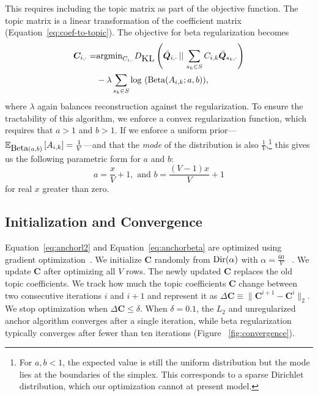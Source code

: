 This requires including the topic matrix as part of the objective function.  The
topic matrix is a linear transformation of the coefficient matrix
(Equation~\ref{eq:coef-to-topic}).  The objective for beta regularization
becomes
\begin{align}
\label{eq:anchorbeta}
\bm{C}_{i,\cdot} = &\text{argmin}_{C_{i,\cdot}} D_{\mbox{\textsc{KL}}} \left( \bar{\bm{Q}}_{i, \cdot}  \,||\, \sum_{s_k \in S} C_{i,k} \bar{\bm{Q}}_{s_k, \cdot} \right) \notag \\
   &- \lambda \sum_{s_k\in S}\mbox{log (Beta}(A_{i,k};a,b)),
\end{align}
where $\lambda$ again balances reconstruction against the regularization.  To
ensure the tractability of this algorithm, we enforce a convex regularization
function, which requires that $a >1$ and $b>1$.  If
we enforce a uniform prior---$\mathbb{E}_{\mbox{Beta}(a,b)}\left[  A_{i,k} \right] = \frac{1}{V}$---and
that the \emph{mode} of the distribution is also $\frac{1}{V}$,\footnote{For
  $a,b < 1$, the expected value is still the uniform distribution but the mode
  lies at the boundaries of the simplex.  This corresponds to a sparse Dirichlet
  distribution, which our optimization cannot at present model.} this gives us
the following parametric form for $a$ and $b$:
\begin{equation}
a =\frac{x}{V} +1, \mbox{ and } b=\frac{(V-1)x}{V}+1
\end{equation}
for real $x$ greater than zero.

\subsection{Initialization and Convergence}

Equation~\ref{eq:anchorl2} and Equation~\ref{eq:anchorbeta} are optimized using
 gradient optimization~\cite{galassi-03}.  We initialize $\bm {C}$
randomly from $\mbox{Dir}(\alpha)$ with $\alpha = \frac{60}{V}$ ~\cite{wallach-09b}.
We update $\bm{C}$ after optimizing all $V$ rows. The newly updated $\bm {C}$
replaces the old topic coefficients.  We track how much the topic coefficients
$\bm{C}$ change between two consecutive iterations $i$ and $i+1$ and represent
it as $\Delta \bm{C} \equiv \|\bm{C}^{i+1}- \bm{C}^i \|_2$.  We stop
optimization when $\Delta \bm{C} \le \delta$.  When $\delta=0.1$, the $L_2$ and
unregularized anchor algorithm converges after a single iteration, while beta
regularization typically converges after fewer than ten iterations (Figure
~\ref{fig:convergence}).